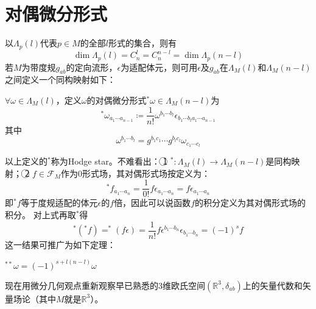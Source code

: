 \section{对偶微分形式}

以$\Lambda_p(l)$代表$p \in M$的全部$l$形式的集合，则有
$$\dim\Lambda_p(l) = C^l_n = C^{n - l}_n = \dim\Lambda_p(n - l)$$
若$M$为带度规$g_{ab}$的定向流形，$\epsilon$为适配体元，则可用$\epsilon$及$g_{ab}$在$\Lambda_M(l)$和$\Lambda_M(n - l)$之间定义一个同构映射如下：

\begin{definition}
    $\forall \omega \in \Lambda_M(l)$，定义$\omega$的对偶微分形式$^*\omega \in \Lambda_M(n - l)$为
    $$^*\omega_{a_1 \cdots a_{n - 1}} \coloneq \frac{1}{n!}\omega^{b_1 \cdots b_l}\epsilon_{b_1 \cdots b_l a_1 \cdots a_{n - 1}}$$
    其中
    $$\omega^{b_1 \cdots b_l} = g^{b_1c_1} \cdots g^{b_lc_l}\omega_{c_1 \cdots c_l}$$
\end{definition}

\begin{note}
    以上定义的$^*$称为Hodge star。不难看出：
    \textcircled{1} $^* \colon \Lambda_M(l) \to \Lambda_M(n - l)$是同构映射；
    \textcircled{2} $f \in \mathscr{F}_M$作为$0$形式场，其对偶形式场按定义为：
    $$^*f_{a_1 \cdots a_n} = \frac{1}{0!}f\epsilon_{a_1 \cdots a_n} = f\epsilon_{a_1 \cdots a_n}$$
    即$^*f$等于度规适配的体元$\epsilon$的$f$倍，因此可以说函数$f$的积分定义为其对偶形式场的积分。
    对上式再取$^*$得
    $$^*(^*f) = ^*(f\epsilon) = \frac{1}{n!}f\epsilon^{b_1 \cdots b_n}\epsilon_{b_1 \cdots b_n} = (-1)^sf$$
    这一结果可推广为如下定理：
\end{note}

\begin{theorem}
    $^{**}\omega = (-1)^{s + l(n - l)}\omega$
\end{theorem}

现在用微分几何观点重新观察早已熟悉的$3$维欧氏空间$(\mathbb{R}^3, \delta_{ab})$上的矢量代数和矢量场论（其中$M$就是$\mathbb{R}^3$）。

